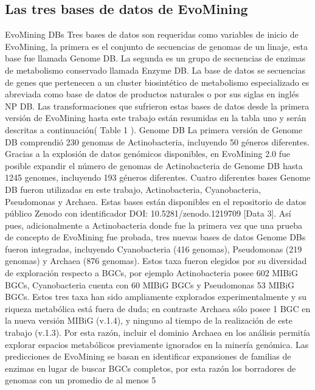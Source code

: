 \documentclass[12pt,twoside]{reedthesis}
\begin{document}
  \subsection{Las tres bases de datos de
  EvoMining}\label{las-tres-bases-de-datos-de-evomining-1}
  
  EvoMining DBs Tres bases de datos son requeridas como variables de
  inicio de EvoMining, la primera es el conjunto de secuencias de genomas
  de un linaje, esta base fue llamada Genome DB. La segunda es un grupo de
  secuencias de enzimas de metabolismo conservado llamada Enzyme DB. La
  base de datos se secuencias de genes que pertenecen a un cluster
  biosintético de metabolismo especializado es abreviada como base de
  datos de productos naturales o por sus siglas en inglés NP DB. Las
  transformaciones que sufrieron estas bases de datos desde la primera
  versión de EvoMining hasta este trabajo están resumidas en la tabla uno
  y serán descritas a continuación( Table 1 ). Genome DB La primera
  versión de Genome DB comprendió 230 genomas de Actinobacteria,
  incluyendo 50 géneros diferentes. Gracias a la explosión de datos
  genómicos disponibles, en EvoMining 2.0 fue posible expandir el número
  de genomas de Actinobacteria de Genome DB hasta 1245 genomes, incluyendo
  193 géneros diferentes. Cuatro diferentes bases Genome DB fueron
  utilizadas en este trabajo, Actinobacteria, Cyanobacteria, Pseudomonas y
  Archaea. Estas bases están disponibles en el repositorio de datos
  público Zenodo con identificador DOI: 10.5281/zenodo.1219709 {[}Data
  3{]}. Así pues, adicionalmente a Actinobacteria donde fue la primera vez
  que una prueba de concepto de EvoMining fue probada, tres nuevas bases
  de datos Genome DBs fueron integradas, incluyendo Cyanobacteria (416
  genomas), Pseudomonas (219 genomas) y Archaea (876 genomas). Estos taxa
  fueron elegidos por su diversidad de exploración respecto a BGCs, por
  ejemplo Actinobacteria posee 602 MIBiG BGCs, Cyanobacteria cuenta con 60
  MIBiG BGCs y Pseudomonas 53 MIBiG BGCs. Estos tres taxa han sido
  ampliamente explorados experimentalmente y su riqueza metabólica está
  fuera de duda; en contraste Archaea sólo posee 1 BGC en la nueva versión
  MIBiG (v.1.4), y ninguno al tiempo de la realización de este trabajo
  (v.1.3). Por esta razón, incluir el dominio Archaea en los análisis
  permitía explorar espacios metabólicos previamente ignorados en la
  minería genómica. Las predicciones de EvoMining se basan en identificar
  expansiones de familias de enzimas en lugar de buscar BGCs completos,
  por esta razón los borradores de genomas con un promedio de al menos 5
\end{document}
